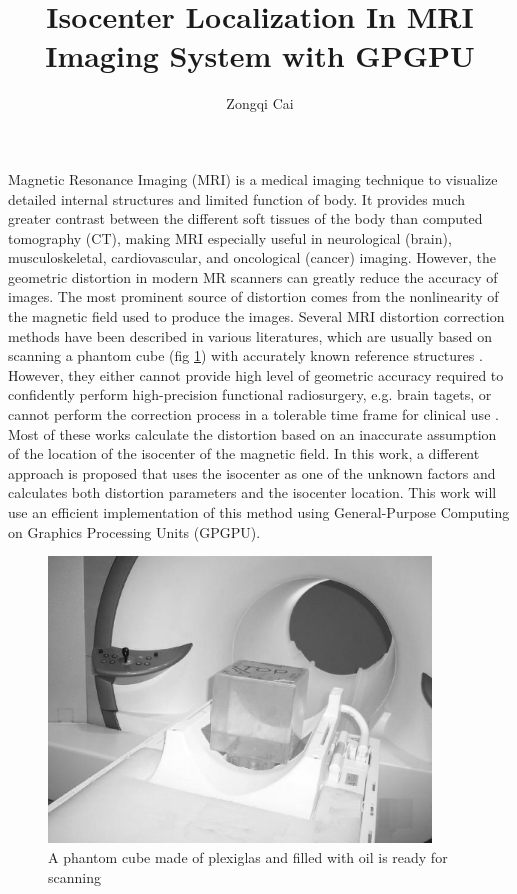 \documentclass{sbthesis}
\title{Isocenter Localization In MRI Imaging System with GPGPU}
\author{Zongqi Cai}
\begin{document}
\ThesisProposal
{}
\label{Introduction}

\indent

Magnetic Resonance Imaging (MRI) is a medical imaging technique to visualize detailed
internal structures and limited function of body. It provides much greater contrast
between the different soft tissues of the body than computed tomography (CT), making
MRI especially useful in neurological (brain), musculoskeletal, cardiovascular, and
oncological (cancer) imaging. However, the geometric distortion in modern MR scanners can
greatly reduce the accuracy of images. The most prominent source of distortion
comes from the nonlinearity of the magnetic field used to produce the images.
Several MRI distortion correction methods have been described in various literatures,
which are usually based on scanning a phantom cube (fig \ref{fig:1}) with accurately known reference structures \cite{R3, R4, R5, R6}. However, they either cannot provide high level of geometric
accuracy required to confidently perform high-precision functional radiosurgery, e.g. brain
tagets, or cannot perform the correction process in a tolerable time frame for clinical use \cite{tom}.
Most of these works calculate the distortion based on an inaccurate assumption of the location of the isocenter
of the magnetic field.
In this work, a different approach is proposed that uses the isocenter as one of the unknown factors and calculates
both distortion parameters and the isocenter location.  %
This work will use an efficient implementation of this
method using General-Purpose Computing on Graphics Processing Units (GPGPU).

\begin{figure}[htb]
  \begin{minipage}{0.80\linewidth}
    \centering
    \centerline{\mbox{\includegraphics[width=4in]{images/phantom_scanner2.eps}}}
    \centerline{}\medskip
  \end{minipage}
  \caption{A phantom cube made of plexiglas and filled with oil is ready for scanning} \label{fig:1}
\end{figure} 
\end{document}

